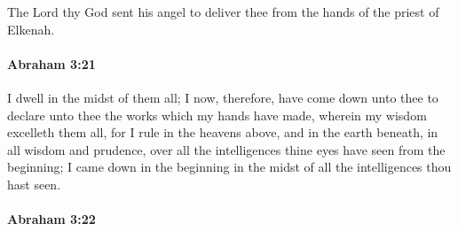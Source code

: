 			The Lord thy God sent his angel to deliver thee from the hands of the priest of Elkenah.


		\paragraph{Abraham 3:21} %
			\label{ABRAHAM-3-21}

			I dwell in the midst of them all; I now, therefore, have come down unto thee to declare unto thee the works which my hands have made, wherein my wisdom excelleth them all, for I rule in the heavens above, and in the earth beneath, in all wisdom and prudence, over all the intelligences thine eyes have seen from the beginning; I came down in the beginning in the midst of all the intelligences thou hast seen.


		\paragraph{Abraham 3:22} %
			\label{ABRAHAM-3-22}

